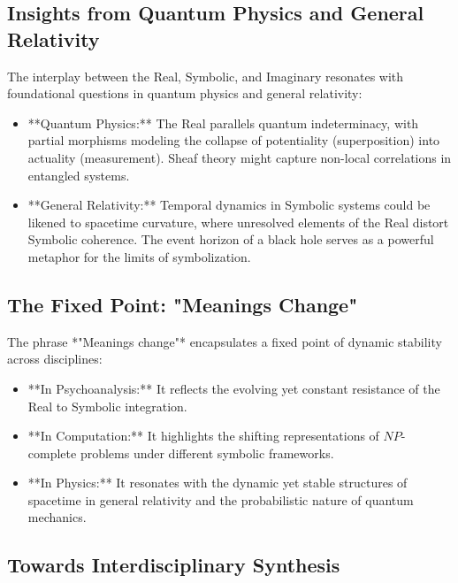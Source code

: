 \documentclass{article}
\begin{document}
\subsection{Insights from Quantum Physics and General Relativity}

The interplay between the Real, Symbolic, and Imaginary resonates with foundational questions in quantum physics and general relativity:
\begin{itemize}
    \item **Quantum Physics:** The Real parallels quantum indeterminacy, with partial morphisms modeling the collapse of potentiality (superposition) into actuality (measurement). Sheaf theory might capture non-local correlations in entangled systems.
    \item **General Relativity:** Temporal dynamics in Symbolic systems could be likened to spacetime curvature, where unresolved elements of the Real distort Symbolic coherence. The event horizon of a black hole serves as a powerful metaphor for the limits of symbolization.
\end{itemize}

\subsection{The Fixed Point: "Meanings Change"}

The phrase *"Meanings change"* encapsulates a fixed point of dynamic stability across disciplines:
\begin{itemize}
    \item **In Psychoanalysis:** It reflects the evolving yet constant resistance of the Real to Symbolic integration.
    \item **In Computation:** It highlights the shifting representations of \( NP \)-complete problems under different symbolic frameworks.
    \item **In Physics:** It resonates with the dynamic yet stable structures of spacetime in general relativity and the probabilistic nature of quantum mechanics.
\end{itemize}

\subsection{Towards Interdisciplinary Synthesis}
\end{document}
